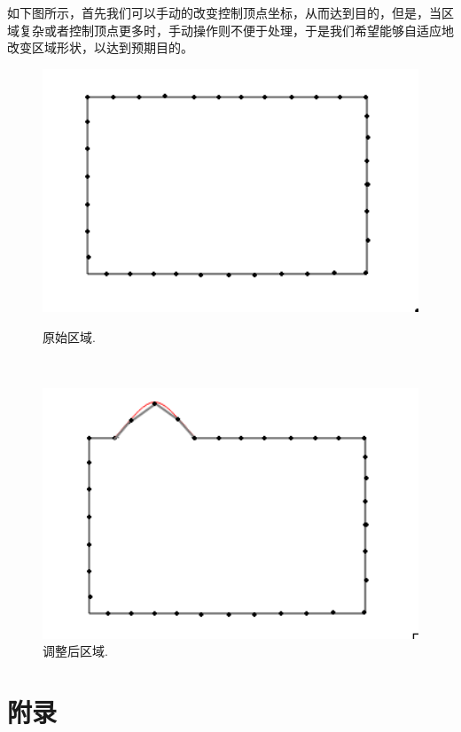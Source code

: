 \documentclass[12pt,a4paper]{article}
\begin{document}
如下图所示，首先我们可以手动的改变控制顶点坐标，从而达到目的，但是，当区域复杂或者控制顶点更多时，手动操作则不便于处理，于是我们希望能够自适应地改变区域形状，以达到预期目的。
\begin{figure}[ht]
\centering     %
\begin{minipage}[t]{0.4\linewidth}%
\includegraphics[width=1.2\textwidth]{./figures/figure1.png}
\caption{原始区域.}%
\label{fig:liuchengtu1}%
\end{minipage} 
\hfill
\begin{minipage}[t]{0.4\linewidth}
\centering
\includegraphics[width=1.2\textwidth]{./figures/figure2.png}
\caption{调整后区域.}%
\label{fig:liuchengtu2}
\end{minipage}
\end{figure}


\section{附录}
\end{document}
